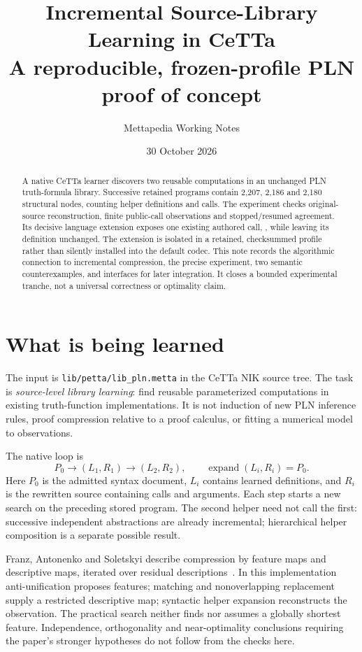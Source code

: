 \documentclass[11pt,a4paper]{article}
\title{Incremental Source-Library Learning in CeTTa\\
  \large A reproducible, frozen-profile PLN proof of concept}
\author{Mettapedia Working Notes}
\date{30 October 2026}
\newcommand{\code}[1]{\texttt{\detokenize{#1}}}
\newcommand{\file}[1]{\nolinkurl{#1}}
\begin{document}
\maketitle

\begin{abstract}
A native CeTTa learner discovers two reusable computations in an unchanged PLN
truth-formula library. Successive retained programs contain 2,207, 2,186 and
2,180 structural nodes, counting helper definitions and calls. The experiment
checks original-source reconstruction, finite public-call observations and
stopped/resumed agreement. Its decisive language extension exposes one existing
authored call, \code{/safe}, while leaving its definition unchanged. The
extension is isolated in a retained, checksummed profile rather than silently
installed into the default codec. This note records the algorithmic connection
to incremental compression, the precise experiment, two semantic
counterexamples, and interfaces for later integration. It closes a bounded
experimental tranche, not a universal correctness or optimality claim.
\end{abstract}

\section{What is being learned}

The input is \file{lib/petta/lib_pln.metta} in the CeTTa NIK source tree.
The task is \emph{source-level library learning}: find reusable parameterized
computations in existing truth-function implementations. It is not induction
of new PLN inference rules, proof compression relative to a proof calculus,
or fitting a numerical model to observations.

The native loop is
\[
 P_0 \longrightarrow (L_1,R_1) \longrightarrow (L_2,R_2),
 \qquad \operatorname{expand}(L_i,R_i)=P_0.
\]
Here $P_0$ is the admitted syntax document, $L_i$ contains learned definitions,
and $R_i$ is the rewritten source containing calls and arguments. Each step
starts a new search on the preceding stored program. The second helper need
not call the first: successive independent abstractions are already incremental;
hierarchical helper composition is a separate possible result.

Franz, Antonenko and Soletskyi describe compression by feature maps and
descriptive maps, iterated over residual descriptions~\cite{franz}.
In this implementation anti-unification proposes features; matching and
nonoverlapping replacement supply a restricted descriptive map; syntactic
helper expansion reconstructs the observation. The practical search neither
finds nor assumes a globally shortest feature. Independence, orthogonality and
near-optimality conclusions requiring the paper's stronger hypotheses do not
follow from the checks here.
\end{document}
